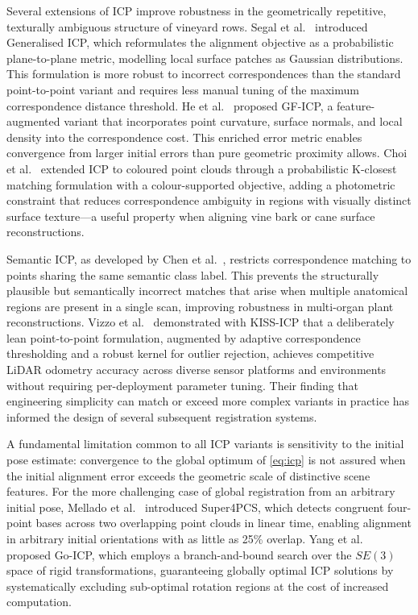 Several extensions of ICP improve robustness in the geometrically repetitive, texturally ambiguous structure of vineyard rows. Segal et al.~\cite{segalGeneralizedICP2009} introduced Generalised ICP, which reformulates the alignment objective as a probabilistic plane-to-plane metric, modelling local surface patches as Gaussian distributions. This formulation is more robust to incorrect correspondences than the standard point-to-point variant and requires less manual tuning of the maximum correspondence distance threshold. He et al.~\cite{heIterativeClosestPoints2017} proposed GF-ICP, a feature-augmented variant that incorporates point curvature, surface normals, and local density into the correspondence cost. This enriched error metric enables convergence from larger initial errors than pure geometric proximity allows. Choi et al.~\cite{choiIterativeKClosestPoint2020} extended ICP to coloured point clouds through a probabilistic K-closest matching formulation with a colour-supported objective, adding a photometric constraint that reduces correspondence ambiguity in regions with visually distinct surface texture---a useful property when aligning vine bark or cane surface reconstructions.

Semantic ICP, as developed by Chen et al.~\cite{chenSemanticICPIterativeClosest2025}, restricts correspondence matching to points sharing the same semantic class label. This prevents the structurally plausible but semantically incorrect matches that arise when multiple anatomical regions are present in a single scan, improving robustness in multi-organ plant reconstructions. Vizzo et al.~\cite{vizzoKISSICPDefensePointtoPoint2023} demonstrated with KISS-ICP that a deliberately lean point-to-point formulation, augmented by adaptive correspondence thresholding and a robust kernel for outlier rejection, achieves competitive LiDAR odometry accuracy across diverse sensor platforms and environments without requiring per-deployment parameter tuning. Their finding that engineering simplicity can match or exceed more complex variants in practice has informed the design of several subsequent registration systems.

A fundamental limitation common to all ICP variants is sensitivity to the initial pose estimate: convergence to the global optimum of \cref{eq:icp} is not assured when the initial alignment error exceeds the geometric scale of distinctive scene features. For the more challenging case of global registration from an arbitrary initial pose, Mellado et al.~\cite{melladoSuper4PCSFastGlobal2014} introduced Super4PCS, which detects congruent four-point bases across two overlapping point clouds in linear time, enabling alignment in arbitrary initial orientations with as little as 25\% overlap. Yang et al.~\cite{yangGoICPGloballyOptimal2016} proposed Go-ICP, which employs a branch-and-bound search over the $SE(3)$ space of rigid transformations, guaranteeing globally optimal ICP solutions by systematically excluding sub-optimal rotation regions at the cost of increased computation.

